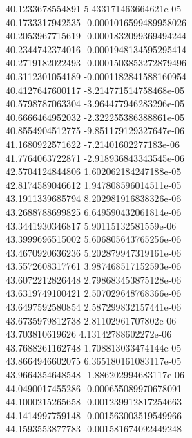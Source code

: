 {40.1233678554891 5.433171463664621e-05 \\
40.1733317942535 -0.0001016599489958026 \\
40.2053967715619 -0.0001832099369494244 \\
40.2344742374016 -0.0001948134595295414 \\
40.2719182022493 -0.0001503853272879496 \\
40.3112301054189 -0.0001182841588160954 \\
40.4127647600117 -8.214771514758468e-05 \\
40.5798787063304 -3.964477946283296e-05 \\
40.6666464952032 -2.322255386388861e-05 \\
40.8554904512775 -9.851179129327647e-06 \\
41.1680922571622 -7.21401602277183e-06 \\
41.7764063722871 -2.918936843343545e-06 \\
42.5704124844806 1.602062184247188e-05 \\
42.8174589046612 1.947808596014511e-05 \\
43.1911339685794 8.202981916838326e-06 \\
43.2688788699825 6.649590432061814e-06 \\
43.3441930346817 5.90115132581559e-06 \\
43.3999696515002 5.606805643765256e-06 \\
43.4670920636236 5.202879947319161e-06 \\
43.5572608317761 3.987468517152593e-06 \\
43.6072212826448 2.798683453875128e-06 \\
43.6319749100421 2.507029648768366e-06 \\
43.6497592580854 2.587299832157441e-06 \\
43.6735979812738 2.81102961707802e-06 \\
43.703810619626 4.13142788602272e-06 \\
43.7688261162748 1.708813033474144e-05 \\
43.8664946602075 6.365180161083117e-05 \\
43.9664354648548 -1.886202994683117e-06 \\
44.0490017455286 -0.000655089970678091 \\
44.1000215265658 -0.001239912817254663 \\
44.1414997759148 -0.001563003519549966 \\
44.1593553877783 -0.001581674092449248 \\
}
